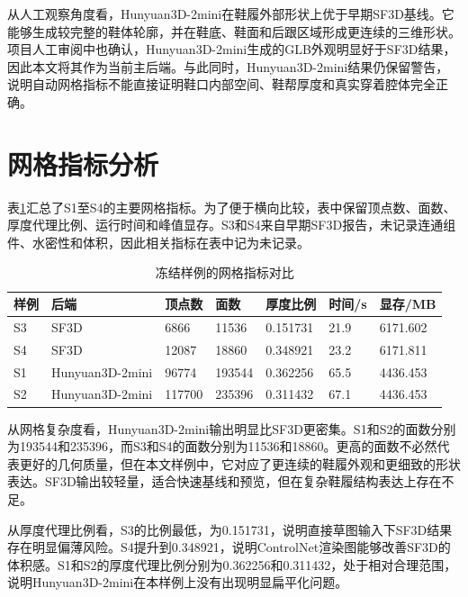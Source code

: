 从人工观察角度看，Hunyuan3D-2mini在鞋履外部形状上优于早期SF3D基线。它能够生成较完整的鞋体轮廓，并在鞋底、鞋面和后跟区域形成更连续的三维形状。项目人工审阅中也确认，Hunyuan3D-2mini生成的GLB外观明显好于SF3D结果，因此本文将其作为当前主后端。与此同时，Hunyuan3D-2mini结果仍保留警告，说明自动网格指标不能直接证明鞋口内部空间、鞋帮厚度和真实穿着腔体完全正确。

\section{网格指标分析}

表\ref{tab:mesh-metrics}汇总了S1至S4的主要网格指标。为了便于横向比较，表中保留顶点数、面数、厚度代理比例、运行时间和峰值显存。S3和S4来自早期SF3D报告，未记录连通组件、水密性和体积，因此相关指标在表中记为未记录。

\begin{table}[htbp]
  \centering
  \caption{冻结样例的网格指标对比}
  \label{tab:mesh-metrics}
  \footnotesize
  \setlength{\tabcolsep}{2pt}
  \begin{tabular}{@{}p{}p{}p{}p{}p{}p{}p{}@{}}
    \toprule
    样例 & 后端 & 顶点数 & 面数 & 厚度比例 & 时间/s & 显存/MB \\
    \midrule
    S3 & SF3D & 6866 & 11536 & 0.151731 & 21.9 & 6171.602 \\
    S4 & SF3D & 12087 & 18860 & 0.348921 & 23.2 & 6171.811 \\
    S1 & Hunyuan3D-2mini & 96774 & 193544 & 0.362256 & 65.5 & 4436.453 \\
    S2 & Hunyuan3D-2mini & 117700 & 235396 & 0.311432 & 67.1 & 4436.453 \\
    \bottomrule
  \end{tabular}
\end{table}

从网格复杂度看，Hunyuan3D-2mini输出明显比SF3D更密集。S1和S2的面数分别为193544和235396，而S3和S4的面数分别为11536和18860。更高的面数不必然代表更好的几何质量，但在本文样例中，它对应了更连续的鞋履外观和更细致的形状表达。SF3D输出较轻量，适合快速基线和预览，但在复杂鞋履结构表达上存在不足。

从厚度代理比例看，S3的比例最低，为0.151731，说明直接草图输入下SF3D结果存在明显偏薄风险。S4提升到0.348921，说明ControlNet渲染图能够改善SF3D的体积感。S1和S2的厚度代理比例分别为0.362256和0.311432，处于相对合理范围，说明Hunyuan3D-2mini在本样例上没有出现明显扁平化问题。


